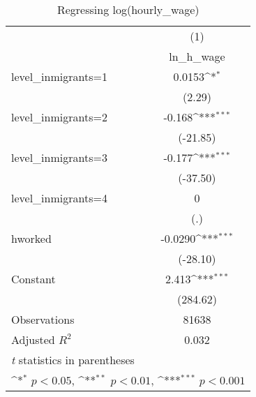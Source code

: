 \begin{table}[htbp]\centering
\def\sym#1{\ifmmode^{#1}\else\(^{#1}\)\fi}
\caption{Regressing log(hourly\_wage)}
\begin{tabular}{l*{1}{c}}
\hline\hline
                    &\multicolumn{1}{c}{(1)}\\
                    &\multicolumn{1}{c}{ln\_h\_wage}\\
\hline
level\_inmigrants=1  &      0.0153\sym{*}  \\
                    &      (2.29)         \\
[1em]
level\_inmigrants=2  &      -0.168\sym{***}\\
                    &    (-21.85)         \\
[1em]
level\_inmigrants=3  &      -0.177\sym{***}\\
                    &    (-37.50)         \\
[1em]
level\_inmigrants=4  &           0         \\
                    &         (.)         \\
[1em]
hworked             &     -0.0290\sym{***}\\
                    &    (-28.10)         \\
[1em]
Constant            &       2.413\sym{***}\\
                    &    (284.62)         \\
\hline
Observations        &       81638         \\
Adjusted \(R^{2}\)  &       0.032         \\
\hline\hline
\multicolumn{2}{l}{\footnotesize \textit{t} statistics in parentheses}\\
\multicolumn{2}{l}{\footnotesize \sym{*} \(p<0.05\), \sym{**} \(p<0.01\), \sym{***} \(p<0.001\)}\\
\end{tabular}
\end{table}

